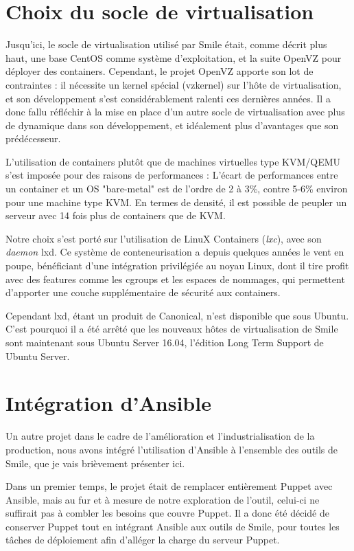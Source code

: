 \documentclass[14 pt,a4paper]{extreport}
\begin{document}
\section{Choix du socle de virtualisation}

Jusqu'ici, le socle de virtualisation utilisé par Smile était, comme décrit plus haut, une base CentOS comme système d'exploitation, et la suite OpenVZ pour déployer des containers. Cependant, le projet OpenVZ apporte son lot de contraintes : il nécessite un kernel spécial (vzkernel) sur l'hôte de virtualisation, et son développement s'est considérablement ralenti ces dernières années. Il a donc fallu réfléchir à la mise en place d'un autre socle de virtualisation avec plus de dynamique dans son développement, et idéalement plus d'avantages que son prédécesseur.

L'utilisation de containers plutôt que de machines virtuelles type KVM/QEMU s'est imposée pour des raisons de performances : L'écart de performances entre un container et un OS "bare-metal" est de l'ordre de 2 à 3\%, contre 5-6\% environ pour une machine type KVM. En termes de densité, il est possible de peupler un serveur avec 14 fois plus de containers que de KVM.

Notre choix s'est porté sur l'utilisation de LinuX Containers (\emph{lxc}), avec son \emph{daemon} lxd. Ce système de conteneurisation a depuis quelques années le vent en poupe, bénéficiant d'une intégration privilégiée au noyau Linux, dont il tire profit avec des features comme les cgroups et les espaces de nommages, qui permettent d'apporter une couche supplémentaire de sécurité aux containers. 

Cependant lxd, étant un produit de Canonical, n'est disponible que sous Ubuntu. C'est pourquoi il a été arrêté que les nouveaux hôtes de virtualisation de Smile sont maintenant sous Ubuntu Server 16.04, l'édition Long Term Support de Ubuntu Server.

\section{Intégration d'Ansible}

Un autre projet dans le cadre de l'amélioration et l'industrialisation de la production, nous avons intégré l'utilisation d'Ansible à l'ensemble des outils de Smile, que je vais brièvement présenter ici.

Dans un premier temps, le projet était de remplacer entièrement Puppet avec Ansible, mais au fur et à mesure de notre exploration de l'outil, celui-ci ne suffirait pas à combler les besoins que couvre Puppet. Il a donc été décidé de conserver Puppet tout en intégrant Ansible aux outils de Smile, pour toutes les tâches de déploiement afin d'alléger la charge du serveur Puppet.
\end{document}
